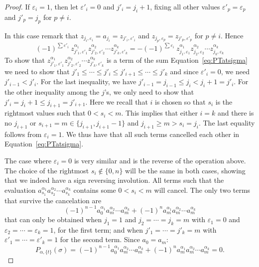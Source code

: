 \documentclass[12pt]{amsart}
\theoremstyle{definition}
\theoremstyle{remark}
\numberwithin{equation}{section}
\renewcommand{\epsilon}{\varepsilon}
\begin{document}
\begin{proof}
\medskip
\noindent
If $\epsilon_i=1$, then let $\epsilon'_i=0$ and $j'_i=j_i+1$, fixing all other values $\epsilon'_p=\epsilon_p$ and $j'_p=j_p$ for $p\not= i$.

\medskip
In this case remark that $z_{j_i,\epsilon_i}=a_{j_i}=z_{j'_i,\epsilon'_i}$ and $z_{j_p,\epsilon_p}=z_{j'_p,\epsilon'_p}$ for  $p\not= i$. Hence
 $$ (-1)^{\sum \epsilon'_i}\ z_{j'_1,\epsilon'_1}^{\alpha_1}z_{j'_2,\epsilon'_2}^{\alpha_2} \cdots z_{j'_k,\epsilon'_k}^{\alpha_k}
  = - (-1)^{\sum \epsilon_i}\ z_{j_1,\epsilon_1}^{\alpha_1}z_{j_2,\epsilon_2}^{\alpha_2} \cdots z_{j_k,\epsilon_k}^{\alpha_k}$$
 To show that $z_{j'_1,\epsilon'_1}^{\alpha_1}z_{j'_2,\epsilon'_2}^{\alpha_2} \cdots z_{j'_k,\epsilon'_k}^{\alpha_k}$ is a term of the sum Equation~\eqref{eq:PTatsigma}
 we need to show that $j'_1\le\cdots\le j'_{i}\le j'_{i+1}\le\cdots\le j'_{k}$ and since $\epsilon'_i=0$, we need $j'_{i-1}<j'_i$.
 For the last inequality, we have $j'_{i-1}=j_{i-1}\le j_i<j_i+1=j'_i$. For the other inequality among the $j$'s, we only need to show that $j'_{i}=j_i+1\le j_{i+1}= j'_{i+1}$.
 Here we recall that $i$ is chosen so that $s_i$ is the rightmost values such that $0<s_i<m$. This implies that either $i=k$ and there is no $j_{i+1}$ or $s_{i+1}=m\in\{j_{i+1},j_{i+1}-1\}$
 and $j_{i+1}\ge m >s_i=j_i$. The last equality follows from $\epsilon_i=1$. We thus have that all such terms cancelled each other in Equation~\eqref{eq:PTatsigma}.
 
 The case where $\epsilon_i=0$ is very similar and is the reverse of the operation above. The choice of the rightmost $s_i\not\in\{0,n\}$ will be the same in both cases, showing that we indeed
 have a sign reversing involution. All terms such that the evaluation $a_{s_1}^{\alpha_1}a_{s_2}^{\alpha_2}\cdots a_{s_k}^{\alpha_k}$ contains some $0<s_i<m$ will cancel.
 The only two terms that survive the cancelation are
 $$(-1)^{n-1}a_{0}^{\alpha_1}a_{m}^{\alpha_2}\cdots a_{m}^{\alpha_k}+  (-1)^n a_{m}^{\alpha_1}a_{m}^{\alpha_2}\cdots a_{m}^{\alpha_k}$$
 that can only be obtained when $j_1=1$ and $j_2=\cdots=j_k=m$ with $\epsilon_1=0$ and $\epsilon_2=\cdots=\epsilon_k=1$, for the first term;
 and when $j'_1=\cdots=j'_k=m$ with $\epsilon'_1=\cdots=\epsilon'_k=1$ for the second term. Since $a_0=a_m$:
  $$P_{\alpha,\{t\}}(\sigma)=(-1)^{n-1}a_{0}^{\alpha_1}a_{m}^{\alpha_2}\cdots a_{m}^{\alpha_k}+  (-1)^n a_{m}^{\alpha_1}a_{m}^{\alpha_2}\cdots a_{m}^{\alpha_k}=0.$$



\end{proof}
\end{document}
